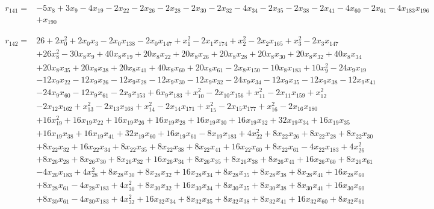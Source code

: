 \documentclass[10pt,letterpaper]{article}
\theoremstyle{remark}\newtheorem{remark}[theorem]{Remark}
\begin{document}
\begin{align*}
r_{141}={}&-5x_{8}+3x_{9}-4x_{19}-2x_{22}-2x_{26}-2x_{28}-2x_{30}-2x_{32}-4x_{34}-2x_{35}-2x_{38}-2x_{41}-4x_{60}-2x_{61}-4x_{183}x_{196}\\
&+x_{190}
\end{align*}

\begin{align*}
r_{142}={}&26+2x_{0}^{2}+2x_{0}x_{3}-2x_{0}x_{138}-2x_{0}x_{147}+x_{1}^{2}-2x_{1}x_{174}+x_{2}^{2}-2x_{2}x_{165}+x_{3}^{2}-2x_{3}x_{147}\\
&+26x_{8}^{2}-30x_{8}x_{9}+40x_{8}x_{19}+20x_{8}x_{22}+20x_{8}x_{26}+20x_{8}x_{28}+20x_{8}x_{30}+20x_{8}x_{32}+40x_{8}x_{34}\\
&+20x_{8}x_{35}+20x_{8}x_{38}+20x_{8}x_{41}+40x_{8}x_{60}+20x_{8}x_{61}-2x_{8}x_{150}-10x_{8}x_{183}+10x_{9}^{2}-24x_{9}x_{19}\\
&-12x_{9}x_{22}-12x_{9}x_{26}-12x_{9}x_{28}-12x_{9}x_{30}-12x_{9}x_{32}-24x_{9}x_{34}-12x_{9}x_{35}-12x_{9}x_{38}-12x_{9}x_{41}\\
&-24x_{9}x_{60}-12x_{9}x_{61}-2x_{9}x_{153}+6x_{9}x_{183}+x_{10}^{2}-2x_{10}x_{156}+x_{11}^{2}-2x_{11}x_{159}+x_{12}^{2}\\
&-2x_{12}x_{162}+x_{13}^{2}-2x_{13}x_{168}+x_{14}^{2}-2x_{14}x_{171}+x_{15}^{2}-2x_{15}x_{177}+x_{16}^{2}-2x_{16}x_{180}\\
&+16x_{19}^{2}+16x_{19}x_{22}+16x_{19}x_{26}+16x_{19}x_{28}+16x_{19}x_{30}+16x_{19}x_{32}+32x_{19}x_{34}+16x_{19}x_{35}\\
&+16x_{19}x_{38}+16x_{19}x_{41}+32x_{19}x_{60}+16x_{19}x_{61}-8x_{19}x_{183}+4x_{22}^{2}+8x_{22}x_{26}+8x_{22}x_{28}+8x_{22}x_{30}\\
&+8x_{22}x_{32}+16x_{22}x_{34}+8x_{22}x_{35}+8x_{22}x_{38}+8x_{22}x_{41}+16x_{22}x_{60}+8x_{22}x_{61}-4x_{22}x_{183}+4x_{26}^{2}\\
&+8x_{26}x_{28}+8x_{26}x_{30}+8x_{26}x_{32}+16x_{26}x_{34}+8x_{26}x_{35}+8x_{26}x_{38}+8x_{26}x_{41}+16x_{26}x_{60}+8x_{26}x_{61}\\
&-4x_{26}x_{183}+4x_{28}^{2}+8x_{28}x_{30}+8x_{28}x_{32}+16x_{28}x_{34}+8x_{28}x_{35}+8x_{28}x_{38}+8x_{28}x_{41}+16x_{28}x_{60}\\
&+8x_{28}x_{61}-4x_{28}x_{183}+4x_{30}^{2}+8x_{30}x_{32}+16x_{30}x_{34}+8x_{30}x_{35}+8x_{30}x_{38}+8x_{30}x_{41}+16x_{30}x_{60}\\
&+8x_{30}x_{61}-4x_{30}x_{183}+4x_{32}^{2}+16x_{32}x_{34}+8x_{32}x_{35}+8x_{32}x_{38}+8x_{32}x_{41}+16x_{32}x_{60}+8x_{32}x_{61}\\

\end{align*}
\end{document}

